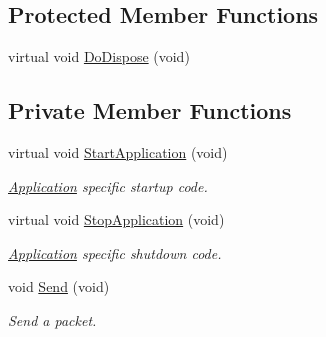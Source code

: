 \subsection*{Protected Member Functions}
\begin{DoxyCompactItemize}
\item 
virtual void \hyperlink{classns3_1_1UdpClient_a414e67a17b0d38c0567a6ffe9a3cb1a3}{Do\+Dispose} (void)
\end{DoxyCompactItemize}
\subsection*{Private Member Functions}
\begin{DoxyCompactItemize}
\item 
virtual void \hyperlink{classns3_1_1UdpClient_a18c3a451f2c18d2edc6a634a913f1474}{Start\+Application} (void)
\begin{DoxyCompactList}\small\item\em \hyperlink{classns3_1_1Application}{Application} specific startup code. \end{DoxyCompactList}\item 
virtual void \hyperlink{classns3_1_1UdpClient_affb385b7a19c3dc83359787d55226712}{Stop\+Application} (void)
\begin{DoxyCompactList}\small\item\em \hyperlink{classns3_1_1Application}{Application} specific shutdown code. \end{DoxyCompactList}\item 
void \hyperlink{classns3_1_1UdpClient_a1f30c47c9851f26913dbff4560979868}{Send} (void)
\begin{DoxyCompactList}\small\item\em Send a packet. \end{DoxyCompactList}\end{DoxyCompactItemize}
